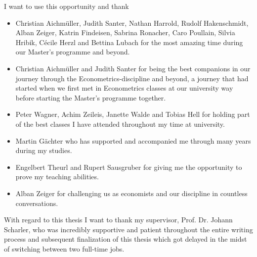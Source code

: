 \documentclass[a4paper,11pt,listof=nochaptergap,oneside,pointednumbers,bibtotoc,bigheadings,liststotoc,hidelinks]{scrbook}
\theoremstyle{mysatz}
\theoremstyle{mydefinition}
\theoremstyle{mytheorem}
\theoremstyle{mybemerkung}
\begin{document}





\newpage
\thispagestyle{empty} %
I want to use this opportunity and thank
\begin{itemize}
	\item Christian Aichmüller, Judith Santer, Nathan Harrold, Rudolf Hakenschmidt, Alban Zeiger, Katrin Findeisen, Sabrina Ronacher, Caro Poullain, Silvia Hribik, Cécile Herzl and Bettina Lubach for the most amazing time during our Master's programme and beyond.
	\item Christian Aichmüller and Judith Santer for being the best companions in our journey through the Econometrics-discipline and beyond, a journey that had started when we first met in Econometrics classes at our university way before starting the Master's programme together.
	\item Peter Wagner, Achim Zeileis, Janette Walde and Tobias Hell for holding part of the best classes I have attended throughout my time at university.
	\item Martin Gächter who has supported and accompanied me through many years during my studies.	
	\item Engelbert Theurl and Rupert Sausgruber for giving me the opportunity to prove my teaching abilities.
	\item Alban Zeiger for challenging us as economists and our discipline in countless conversations.
\end{itemize}

With regard to this thesis I want to thank my supervisor, Prof. Dr. Johann Scharler, who was incredibly supportive and patient throughout the entire writing process and subsequent finalization of this thesis which got delayed in the midst of switching between two full-time jobs.
\end{document}
